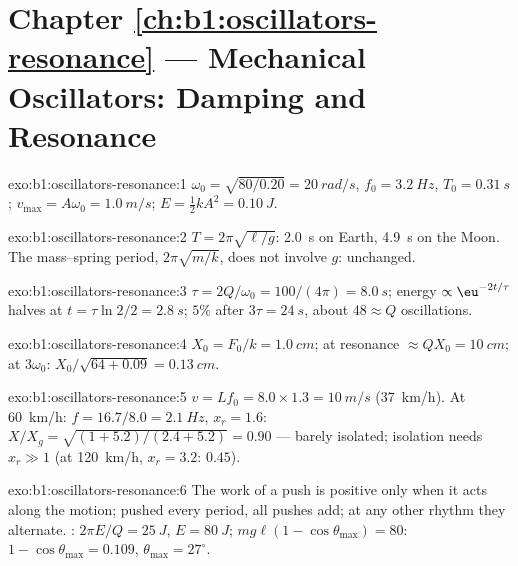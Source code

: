 \section*{Chapter \ref{ch:b1:oscillators-resonance} --- Mechanical Oscillators: Damping and Resonance}

\begin{solution}{exo:b1:oscillators-resonance:1}
$\omega_0 = \sqrt{80/0.20} = \qty{20}{rad/s}$, $f_0 = \qty{3.2}{Hz}$, $T_0 =
\qty{0.31}{s}$; $v_{\max} = A\omega_0 = \qty{1.0}{m/s}$; $E = \tfrac12 kA^2 =
\qty{0.10}{J}$.
\end{solution}

\begin{solution}{exo:b1:oscillators-resonance:2}
$T = 2\pi\sqrt{\ell/g}$: \qty{2.0}{s} on Earth, \qty{4.9}{s} on the Moon.
The mass--spring period, $2\pi\sqrt{m/k}$, does not involve $g$:
unchanged.
\end{solution}

\begin{solution}{exo:b1:oscillators-resonance:3}
$\tau = 2Q/\omega_0 = 100/(4\pi) = \qty{8.0}{s}$; energy $\propto \eu^{-2t/\tau}$
halves at $t = \tau\ln2/2 = \qty{2.8}{s}$; $5\%$ after $3\tau = \qty{24}{s}$,
about $48 \approx Q$ oscillations.
\end{solution}

\begin{solution}{exo:b1:oscillators-resonance:4}
$X_0 = F_0/k = \qty{1.0}{cm}$; at resonance $\approx QX_0 = \qty{10}{cm}$;
at $3\omega_0$: $X_0/\sqrt{64 + 0.09} = \qty{0.13}{cm}$.
\end{solution}

\begin{solution}{exo:b1:oscillators-resonance:5}
$v = Lf_0 = 8.0 \times 1.3 = \qty{10}{m/s}$ (\qty{37}{km/h}). At
\qty{60}{km/h}: $f = 16.7/8.0 = \qty{2.1}{Hz}$, $x_r = 1.6$: $X/X_g =
\sqrt{(1 + 5.2)/(2.4 + 5.2)} = 0.90$ --- barely isolated; isolation
needs $x_r \gg 1$ (at \qty{120}{km/h}, $x_r = 3.2$: $0.45$).
\end{solution}

\begin{solution}{exo:b1:oscillators-resonance:6}
The work of a push is positive only when it acts along the motion;
pushed every period, all pushes add; at any other rhythm they
alternate. : $2\pi E/Q = \qty{25}{J}$, $E = \qty{80}{J}$;
$mg\ell(1 - \cos\theta_{\max}) = 80$: $1 - \cos\theta_{\max} = 0.109$,
$\theta_{\max} = 27^\circ$.
\end{solution}

